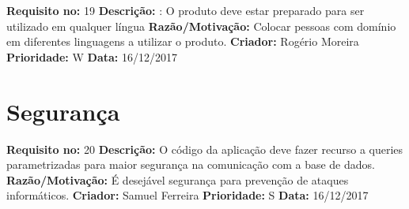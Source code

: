 \begin{framed}
\noindent\textbf{Requisito no:} 19
\vspace{2mm}
\newline\textbf{Descrição:} : O produto deve estar preparado para ser utilizado em qualquer língua
\vspace{1mm}
\newline\textbf{Razão/Motivação:} Colocar pessoas com domínio em diferentes linguagens a utilizar o produto.
\vspace{1mm}
\newline\textbf{Criador:} Rogério Moreira
\vspace{1mm}
\newline\textbf{Prioridade:} W
\vspace{1mm}
\newline\textbf{Data:} 16/12/2017
\end{framed}

\section{Segurança}

\begin{framed}
\noindent\textbf{Requisito no:} 20
\vspace{2mm}
\newline\textbf{Descrição:} O código da aplicação deve fazer recurso a queries parametrizadas para maior segurança na comunicação com a base de dados.
\vspace{1mm}
\newline\textbf{Razão/Motivação:} É desejável segurança para prevenção de ataques informáticos.
\vspace{1mm}
\newline\textbf{Criador:} Samuel Ferreira
\vspace{1mm}
\newline\textbf{Prioridade:} S
\vspace{1mm}
\newline\textbf{Data:} 16/12/2017
\end{framed}